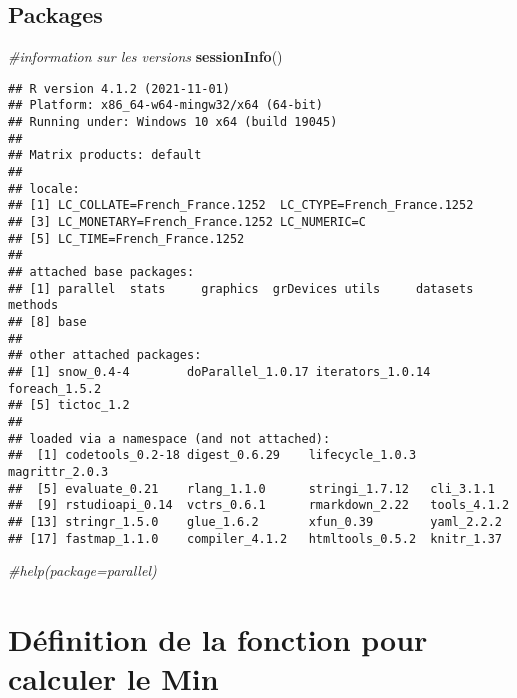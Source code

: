 \documentclass[
]{article}
\newenvironment{Shaded}{\begin{snugshade}}{\end{snugshade}}
\newcommand{\CommentTok}[1]{\textcolor[rgb]{0.56,0.35,0.01}{\textit{#1}}}
\newcommand{\FunctionTok}[1]{\textcolor[rgb]{0.13,0.29,0.53}{\textbf{#1}}}
\newcommand{\NormalTok}[1]{#1}
\begin{document}
\hypertarget{packages}{%
\subsection{Packages}\label{packages}}

\begin{Shaded}
\begin{Highlighting}[]
\CommentTok{\#information sur les versions}
\FunctionTok{sessionInfo}\NormalTok{()}
\end{Highlighting}
\end{Shaded}

\begin{verbatim}
## R version 4.1.2 (2021-11-01)
## Platform: x86_64-w64-mingw32/x64 (64-bit)
## Running under: Windows 10 x64 (build 19045)
## 
## Matrix products: default
## 
## locale:
## [1] LC_COLLATE=French_France.1252  LC_CTYPE=French_France.1252   
## [3] LC_MONETARY=French_France.1252 LC_NUMERIC=C                  
## [5] LC_TIME=French_France.1252    
## 
## attached base packages:
## [1] parallel  stats     graphics  grDevices utils     datasets  methods  
## [8] base     
## 
## other attached packages:
## [1] snow_0.4-4        doParallel_1.0.17 iterators_1.0.14  foreach_1.5.2    
## [5] tictoc_1.2       
## 
## loaded via a namespace (and not attached):
##  [1] codetools_0.2-18 digest_0.6.29    lifecycle_1.0.3  magrittr_2.0.3  
##  [5] evaluate_0.21    rlang_1.1.0      stringi_1.7.12   cli_3.1.1       
##  [9] rstudioapi_0.14  vctrs_0.6.1      rmarkdown_2.22   tools_4.1.2     
## [13] stringr_1.5.0    glue_1.6.2       xfun_0.39        yaml_2.2.2      
## [17] fastmap_1.1.0    compiler_4.1.2   htmltools_0.5.2  knitr_1.37
\end{verbatim}

\begin{Shaded}
\begin{Highlighting}[]
\CommentTok{\#help(package=\textquotesingle{}parallel\textquotesingle{})}
\end{Highlighting}
\end{Shaded}

\hypertarget{duxe9finition-de-la-fonction-pour-calculer-le-min}{%
\section{Définition de la fonction pour calculer le
Min}\label{duxe9finition-de-la-fonction-pour-calculer-le-min}}
\end{document}

